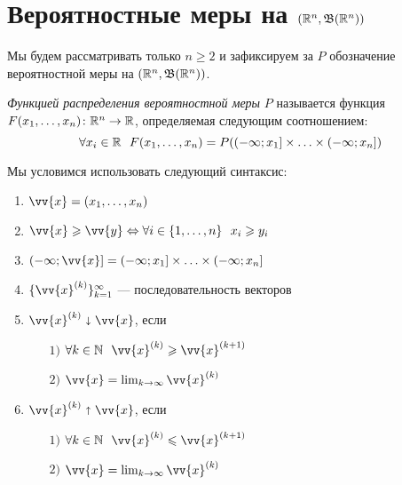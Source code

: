 \section{Вероятностные меры на $(\mathbb{R}^n, \mathfrak{B}(\mathbb{R}^n))$}

\begin{note}
	Мы будем рассматривать только $n \ge 2$ и зафиксируем за $P$ обозначение вероятностной меры на $(\mathbb{R}^n, \mathfrak{B}(\mathbb{R}^n))$.
\end{note}

\begin{definition}
	\textit{Функцией распределения вероятностной меры} $P$ называется функция $F(x_1, \ldots, x_n) \colon \mathbb{R}^n \to \mathbb{R}$, определяемая следующим соотношением:
	\[
		\forall x_i \in \mathbb{R}\ \ F(x_1, \ldots, x_n) = P(\left(-\infty; x_1\right] \times \ldots \times \left(-\infty; x_n\right])
	\]
\end{definition}

\begin{designation}
	Мы условимся использовать следующий синтаксис:
	\begin{enumerate}
		\item \(\vv{x} = (x_1, \ldots, x_n)\)
		
		\item \(\vv{x} \ge \vv{y} \Lra \forall i \in \range{1}{n}\ \ x_i \ge y_i\)
		
		\item \(\rsi{-\infty; \vv{x}} = \rsi{-\infty; x_1} \times \ldots \times \rsi{-\infty; x_n}\)
		
		\item \(\{\vv{x}^{(k)}\}_{k = 1}^\infty\) --- последовательность векторов
		
		\item \(\vv{x}^{(k)} \sda \vv{x}\), если
		\begin{enumerate}
			\item[$1)$] \(\forall k \in \N\ \ \vv{x}^{(k)} \ge \vv{x}^{(k + 1)}\)
			
			\item[$2)$] \(\vv{x} = \lim_{k \to \infty} \vv{x}^{(k)}\)
		\end{enumerate}
	
		\item \(\vv{x}^{(k)} \sua \vv{x}\), если
		\begin{enumerate}
			\item[$1)$] \(\forall k \in \N\ \ \vv{x}^{(k)} \le \vv{x}^{(k + 1)}\)
			
			\item[$2)$] \(\vv{x} = \lim_{k \to \infty} \vv{x}^{(k)}\)
		\end{enumerate}
	\end{enumerate}
\end{designation}

